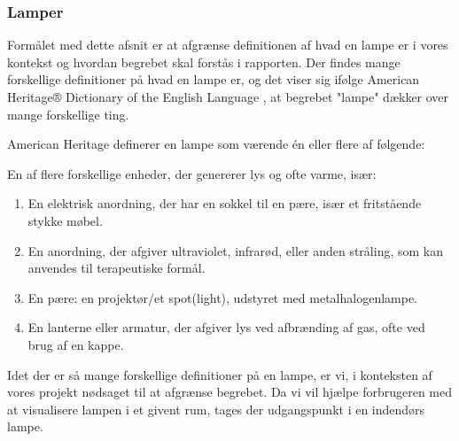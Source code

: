 

\subsubsection{Lamper}
Formålet med dette afsnit er at afgrænse definitionen af hvad en lampe er i vores kontekst og hvordan begrebet skal forstås i rapporten.
Der findes mange forskellige definitioner på hvad en lampe er, og det viser sig ifølge American Heritage® Dictionary of the English Language \cite{american_heritage}, at begrebet "lampe" dækker over mange forskellige ting. 

American Heritage definerer en lampe som værende én eller flere af følgende:

En af flere forskellige enheder, der genererer lys og ofte varme, især:
\begin{enumerate}
    \item En elektrisk anordning, der har en sokkel til en pære, især et fritstående stykke møbel.
    \item En anordning, der afgiver ultraviolet, infrarød, eller anden stråling, som kan anvendes til terapeutiske formål.
    \item En pære: en projektør/et spot(light), udstyret med metalhalogenlampe.
    \item En lanterne eller armatur, der afgiver lys ved afbrænding af gas, ofte ved brug af en kappe.
\end{enumerate}

Idet der er så mange forskellige definitioner på en lampe, er vi, i konteksten af vores projekt nødsaget til at afgrænse begrebet. Da vi vil hjælpe forbrugeren med at visualisere lampen i et givent rum, tages der udgangspunkt i en indendørs lampe.


